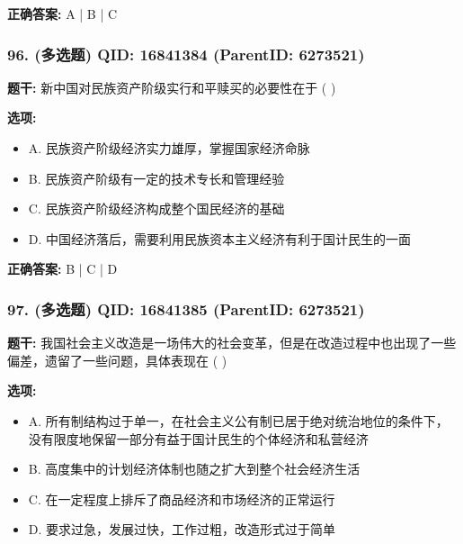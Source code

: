 \documentclass[12pt,UTF8]{ctexart}
\begin{document}
\textbf{正确答案:}
A | B | C

\vspace{0.3em}\hrulefill\vspace{0.7em}

\subsubsection*{96. (多选题) \small QID: 16841384 (ParentID: 6273521)}

\textbf{题干:}
新中国对民族资产阶级实行和平赎买的必要性在于 ( )



\textbf{选项:}
\begin{itemize}[leftmargin=*]

  \item A. 民族资产阶级经济实力雄厚，掌握国家经济命脉

  \item B. 民族资产阶级有一定的技术专长和管理经验

  \item C. 民族资产阶级经济构成整个国民经济的基础

  \item D. 中国经济落后，需要利用民族资本主义经济有利于国计民生的一面

\end{itemize}

\textbf{正确答案:}
B | C | D

\vspace{0.3em}\hrulefill\vspace{0.7em}

\subsubsection*{97. (多选题) \small QID: 16841385 (ParentID: 6273521)}

\textbf{题干:}
我国社会主义改造是一场伟大的社会变革，但是在改造过程中也出现了一些偏差，遗留了一些问题，具体表现在 ( )



\textbf{选项:}
\begin{itemize}[leftmargin=*]

  \item A. 所有制结构过于单一，在社会主义公有制已居于绝对统治地位的条件下，没有限度地保留一部分有益于国计民生的个体经济和私营经济

  \item B. 高度集中的计划经济体制也随之扩大到整个社会经济生活

  \item C. 在一定程度上排斥了商品经济和市场经济的正常运行

  \item D. 要求过急，发展过快，工作过粗，改造形式过于简单

\end{itemize}
\end{document}
